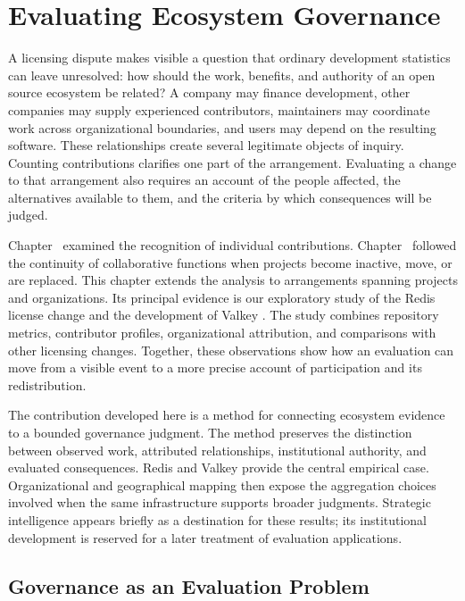 \chapter{Evaluating Ecosystem Governance}
\label{ch:governance}

A licensing dispute makes visible a question that ordinary development statistics can leave unresolved: how should the work, benefits, and authority of an open source ecosystem be related? A company may finance development, other companies may supply experienced contributors, maintainers may coordinate work across organizational boundaries, and users may depend on the resulting software. These relationships create several legitimate objects of inquiry. Counting contributions clarifies one part of the arrangement. Evaluating a change to that arrangement also requires an account of the people affected, the alternatives available to them, and the criteria by which consequences will be judged.

Chapter~ examined the recognition of individual contributions. Chapter~ followed the continuity of collaborative functions when projects become inactive, move, or are replaced. This chapter extends the analysis to arrangements spanning projects and organizations. Its principal evidence is our exploratory study of the Redis license change and the development of Valkey \citep{han2026redis}. The study combines repository metrics, contributor profiles, organizational attribution, and comparisons with other licensing changes. Together, these observations show how an evaluation can move from a visible event to a more precise account of participation and its redistribution.

The contribution developed here is a method for connecting ecosystem evidence to a bounded governance judgment. The method preserves the distinction between observed work, attributed relationships, institutional authority, and evaluated consequences. Redis and Valkey provide the central empirical case. Organizational and geographical mapping then expose the aggregation choices involved when the same infrastructure supports broader judgments. Strategic intelligence appears briefly as a destination for these results; its institutional development is reserved for a later treatment of evaluation applications.

\section{Governance as an Evaluation Problem}
\label{sec:ch9-question}

